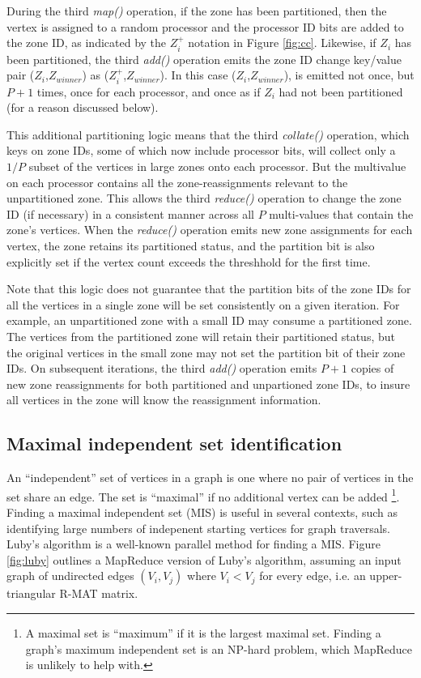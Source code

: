 During the third {\it map()} operation, if the zone has been
partitioned, then the vertex is assigned to a random processor and the
processor ID bits are added to the zone ID, as indicated by the
$Z_i^+$ notation in Figure \ref{fig:cc}.  Likewise, if $Z_i$ has been
partitioned, the third {\it add()} operation emits the zone ID change
key/value pair ($Z_i$,$Z_{winner}$) as ($Z_i^+$,$Z_{winner}$).  In
this case ($Z_i$,$Z_{winner}$), is emitted not once, but $P+1$ times,
once for each processor, and once as if $Z_i$ had not been partitioned
(for a reason discussed below).

This additional partitioning logic means that the third {\it
collate()} operation, which keys on zone IDs, some of which now
include processor bits, will collect only a $1/P$ subset of the
vertices in large zones onto each processor.  But the multivalue on
each processor contains all the zone-reassignments relevant to the
unpartitioned zone.  This allows the third {\it reduce()} operation to
change the zone ID (if necessary) in a consistent manner across all
$P$ multi-values that contain the zone's vertices.  When the {\it
reduce()} operation emits new zone assignments for each vertex, the
zone retains its partitioned status, and the partition bit is also
explicitly set if the vertex count exceeds the threshhold for the
first time.

Note that this logic does not guarantee that the partition bits of the
zone IDs for all the vertices in a single zone will be set
consistently on a given iteration.  For example, an unpartitioned zone
with a small ID may consume a partitioned zone.  The vertices from the
partitioned zone will retain their partitioned status, but the
original vertices in the small zone may not set the partition bit of
their zone IDs.  On subsequent iterations, the third {\it add()}
operation emits $P+1$ copies of new zone reassignments for both
partitioned and unpartioned zone IDs, to insure all vertices in the
zone will know the reassignment information.

\subsection{Maximal independent set identification}

An ``independent'' set of vertices in a graph is one where no pair of
vertices in the set share an edge.  The set is ``maximal'' if no
additional vertex can be added \footnote{A maximal set is ``maximum''
if it is the largest maximal set.  Finding a graph's maximum
independent set is an NP-hard problem, which MapReduce is unlikely to
help with.}.  Finding a maximal independent set (MIS) is useful in
several contexts, such as identifying large numbers of indepenent
starting vertices for graph traversals.  Luby's algorithm \cite{Luby}
is a well-known parallel method for finding a MIS.  Figure
\ref{fig:luby} outlines a MapReduce version of Luby's algorithm,
assuming an input graph of undirected edges $(V_i,V_j)$ where $V_i <
V_j$ for every edge, i.e. an upper-triangular R-MAT matrix.

